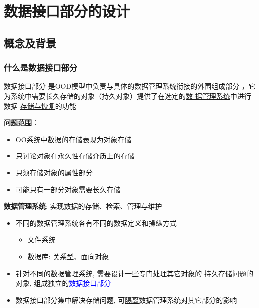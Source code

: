 \documentclass[compress]{beamer}
\begin{document}
\section{数据接口部分的设计}

\subsection{概念及背景}

\begin{frame}
  \frametitle{什么是数据接口部分}
   {
  \begin{block}{数据接口部分}
      是OOD模型中负责与具体的数据管理系统衔接的外围组成部分
      ，它为系统中需要长久存储的对象（持久对象）提供了在选定的\uline{数
      据管理系统}中进行数据
      \uline{存储与恢复}的功能
    \end{block}
    \textbf{问题范围}：
    \begin{itemize}
      \item OO系统中数据的存储表现为对象存储
      \item 只讨论对象在永久性存储介质上的存储
      \item 只须存储对象的属性部分
      \item 可能只有一部分对象需要长久存储
    \end{itemize}
  }
  
   {
    \textbf{数据管理系统}: 实现数据的存储、检索、管理与维护
    \begin{itemize}
      \item 不同的数据管理系统各有不同的数据定义和操纵方式
        \begin{itemize}
          \item 文件系统
          \item 数据库:  关系型、面向对象
        \end{itemize}

      \item 针对不同的数据管理系统, 需要设计一些专门处理其它对象的
        持久存储问题的对象, 组成独立的\textcolor{blue}
        {数据接口部分}
      \item 数据接口部分集中解决存储问题, 可\uline{隔离}数据管理系统对其它部分的影响   
    \end{itemize}
  }
\end{frame}
\end{document}
